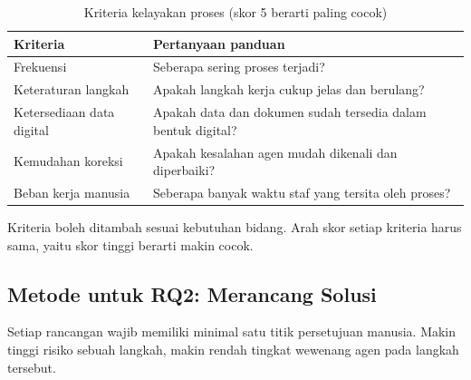 \documentclass[11pt, a4paper]{article}
\begin{document}
\begin{table}[htbp]
  \centering
  \caption{Kriteria kelayakan proses (skor 5 berarti paling cocok)}
  \label{tab:kriteria}
  \begin{tabularx}{\linewidth}{@{}L{4.4cm}Y@{}}
    \toprule
    \textbf{Kriteria} & \textbf{Pertanyaan panduan} \\
    \midrule
    Frekuensi                 & Seberapa sering proses terjadi? \\
    Keteraturan langkah       & Apakah langkah kerja cukup jelas dan berulang? \\
    Ketersediaan data digital & Apakah data dan dokumen sudah tersedia dalam bentuk digital? \\
    Kemudahan koreksi         & Apakah kesalahan agen mudah dikenali dan diperbaiki? \\
    Beban kerja manusia       & Seberapa banyak waktu staf yang tersita oleh proses? \\
    \bottomrule
  \end{tabularx}
\end{table}

Kriteria boleh ditambah sesuai kebutuhan bidang.
Arah skor setiap kriteria harus sama, yaitu skor tinggi berarti makin cocok.

\subsection{Metode untuk RQ2: Merancang Solusi}

Setiap rancangan wajib memiliki minimal satu titik persetujuan manusia.
Makin tinggi risiko sebuah langkah, makin rendah tingkat wewenang agen pada langkah tersebut.
\end{document}
